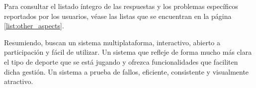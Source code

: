 Para consultar el listado íntegro de las respuestas y los problemas específicos reportados por los usuarios, véase las listas que se encuentran en la página \ref{list:other_aspects}.

Resumiendo, buscan un sistema multiplataforma, interactivo, abierto a participación y fácil de utilizar. Un sistema que refleje de forma mucho más clara el tipo de deporte que se está jugando y ofrezca funcionalidades que faciliten dicha gestión. Un sistema a prueba de fallos, eficiente, consistente y visualmente atractivo.